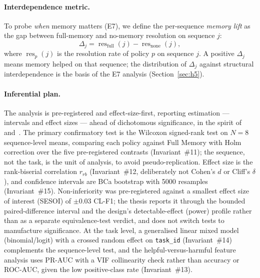 \paragraph{Interdependence metric.}
To probe \emph{when} memory matters (E7), we define the per-sequence \emph{memory lift} as
the gap between full-memory and no-memory resolution on sequence $j$:
\begin{equation}
  \label{eq:memory-lift}
  \Delta_j = \operatorname{res}_{\mathrm{full}}(j) - \operatorname{res}_{\mathrm{none}}(j),
\end{equation}
where $\operatorname{res}_{p}(j)$ is the resolution rate of policy $p$ on sequence $j$. A
positive $\Delta_j$ means memory helped on that sequence; the distribution of $\Delta_j$
against structural interdependence is the basis of the E7 analysis
(Section~\ref{sec:h5}).

\paragraph{Inferential plan.}
The analysis is pre-registered and effect-size-first, reporting estimation --- intervals and
effect sizes --- ahead of dichotomous significance, in the spirit
of~\cite{cumming2014} and~\cite{wasserstein2019}. The primary confirmatory test is the
Wilcoxon signed-rank test on $N=8$ sequence-level means, comparing each policy against Full
Memory with Holm correction over the five pre-registered contrasts (Invariant~\#11); the
sequence, not the task, is the unit of analysis, to avoid pseudo-replication. Effect size is
the rank-biserial correlation $r_{rb}$ (Invariant~\#12, deliberately not Cohen's $d$ or
Cliff's $\delta$), and confidence intervals are BCa bootstrap with 5000 resamples
(Invariant~\#15). Non-inferiority was pre-registered against a smallest effect size of interest (SESOI) of
$\pm0.03$ CL-F1; the thesis reports it through the bounded paired-difference
interval and the design's detectable-effect (power) profile rather than as a separate
equivalence-test verdict, and does not switch tests to manufacture significance. At the task
level, a generalised linear mixed model (binomial/logit) with a crossed random effect on
\texttt{task\_id} (Invariant~\#14) complements the sequence-level test, and the
helpful-versus-harmful feature analysis uses PR-AUC with a VIF collinearity check rather
than accuracy or ROC-AUC, given the low positive-class rate (Invariant~\#13).

